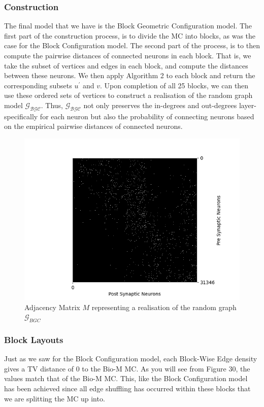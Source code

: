 \subsubsection{Construction}
The final model that we have is the Block Geometric Configuration model. The first part of the construction process, is to divide the MC into blocks, as was the case for the Block Configuration model. The second part of the process, is to then compute the pairwise distances of connected neurons in each block. That is, we take the subset of vertices and edges in each block, and compute the distances between these neurons. We then apply Algorithm 2 to each block and return the corresponding subsets $u^\prime$ and $v$. Upon completion of all 25 blocks, we can then use these ordered sets of vertices to construct a realisation of the random graph model $\mathcal{G_{BGC}}$. Thus, $\mathcal{G_{BGC}}$ not only preserves the in-degrees and out-degrees layer-specifically for each neuron but also the probability of connecting neurons based on the empirical pairwise distances of connected neurons.

\begin{figure}[H]
\begin{center}
\captionsetup{justification=centering}
\includegraphics[width=12cm]{GBC/matrix_BGC.png}
\caption{Adjacency Matrix $M$ representing a realisation of the random graph $\mathcal{G}_{BGC}$}
\end{center}
\end{figure}


\subsubsection{Block Layouts}
Just as we saw for the Block Configuration model, each Block-Wise Edge density gives a TV distance of 0 to the Bio-M MC. As you will see from Figure 30, the values match that of the Bio-M MC. This, like the Block Configuration model has been achieved since all edge shuffling has occurred within these blocks that we are splitting the MC up into.

